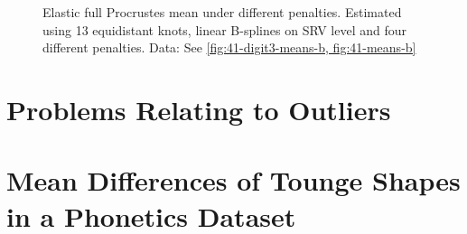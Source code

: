 \begin{figure}
  \centering
  \begin{subfigure}{\textwidth}
  \end{subfigure}
  \begin{subfigure}{\textwidth}
  \end{subfigure}
  \caption{Elastic full Procrustes mean under different penalties.
  Estimated using 13 equidistant knots, linear B-splines on SRV level and four different penalties.
  Data: See \cref{fig:41-digit3-means-b, fig:41-means-b}}
  \label{fig:41-penalty}
\end{figure}


\section{Problems Relating to Outliers}
\label{sec:4-pfits}


\section{Mean Differences of Tounge Shapes in a Phonetics Dataset}
\label{sec:4-tounges}
